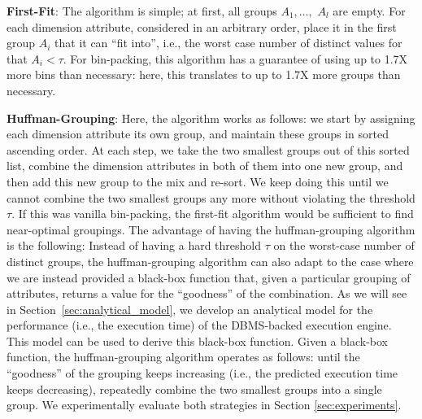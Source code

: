 \squishlist 
  \item {\bf First-Fit}: The algorithm is simple;
  at first, all groups $A_1, \ldots, $ $A_l$ are empty.
  For each dimension attribute, considered in an arbitrary order, place it in the first group
  $A_i$ that it can ``fit into'', i.e., the worst case
  number of distinct values for that $A_i < \tau$.
  For bin-packing, this algorithm has a guarantee of using up to 1.7X more 
  bins than necessary: here, this translates to up to 1.7X more groups than necessary.
  \item {\bf Huffman-Grouping}: Here, the algorithm works as follows:
  we start by assigning each dimension attribute its own group,
  and maintain these groups in sorted ascending order.
  At each step, we take the two smallest groups out of this sorted list, combine
  the dimension attributes in both of them into one new group, and then
  add this new group to the mix and re-sort.
  We keep doing this until we cannot combine the two smallest groups any more
  without violating the threshold $\tau$.
\squishend
If this was vanilla bin-packing, the first-fit algorithm would be sufficient to
find near-optimal groupings. 
The advantage of having the huffman-grouping algorithm is the following: Instead
of having a hard threshold $\tau$ on the worst-case number of distinct groups,
the huffman-grouping algorithm can also adapt to the case where we
are instead provided a black-box function that, given a particular
grouping of attributes, returns a value for the ``goodness'' of the combination.
As we will see in Section~\ref{sec:analytical_model}, 
we develop an analytical model for the performance (i.e., the execution time)
of the DBMS-backed execution engine. 
This model can be used to derive this black-box function.
Given a black-box function, the huffman-grouping algorithm operates
as follows: until the ``goodness'' of the grouping keeps increasing 
(i.e., the predicted execution time keeps decreasing),
repeatedly combine the two smallest groups into a single group.
We experimentally evaluate both strategies in Section \ref{sec:experiments}.
 
